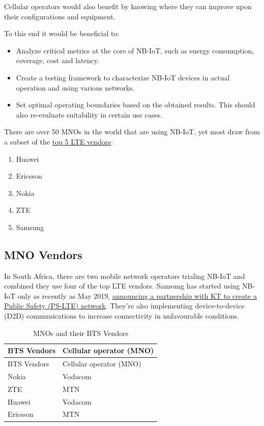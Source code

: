 \documentclass[]{article}
\providecommand{\tightlist}{%
  \setlength{\itemsep}{0pt}\setlength{\parskip}{0pt}}
\begin{document}
Cellular operators would also benefit by knowing where they can improve
upon their configurations and equipment.

To this end it would be beneficial to:

\begin{itemize}
\tightlist
\item
  Analyze critical metrics at the core of NB-IoT, such as energy
  consumption, coverage, cost and latency.
\item
  Create a testing framework to characterize NB-IoT devices in actual
  operation and using various networks.
\item
  Set optimal operating boundaries based on the obtained results. This
  should also re-evaluate suitability in certain use cases.
\end{itemize}

There are over 50 MNOs in the world that are using NB-IoT, yet most draw
from a subset of the
\href{https://www.rcrwireless.com/20160531/network-infrastructure/top-5-wireless-infrastructure-makers-tag4-tag99}{top
5 LTE vendors}:

\begin{enumerate}
\def\labelenumi{\arabic{enumi}.}
\tightlist
\item
  Huawei
\item
  Ericsson
\item
  Nokia
\item
  ZTE
\item
  Samsung
\end{enumerate}

\hypertarget{mno-vendors}{%
\subsection{MNO Vendors}\label{mno-vendors}}

In South Africa, there are two mobile network operators trialing NB-IoT
and combined they use four of the top LTE vendors. Samsung has started
using NB-IoT only as recently as May 2019,
\href{https://enterpriseiotinsights.com/20190506/nb-iot/samsung-kt-launch-nbiot-service-through-ps-lte-network-korea}{announcing
a partnership with KT to create a Public Safety (PS-LTE) network}.
They're also implementing device-to-device (D2D) communications to
increase connectivity in unfavourable conditions.

\begin{longtable}[]{@{}ll@{}}
\caption{MNOs and their BTS Vendors \label{tbl:mno_bts}}\tabularnewline
\toprule
BTS Vendors & Cellular operator (MNO)\tabularnewline
\midrule
\endfirsthead
\toprule
BTS Vendors & Cellular operator (MNO)\tabularnewline
\midrule
\endhead
Nokia & Vodacom\tabularnewline
ZTE & MTN\tabularnewline
Huawei & Vodacom\tabularnewline
Ericsson & MTN\tabularnewline
\bottomrule
\end{longtable}
\end{document}

